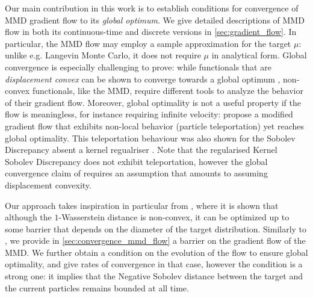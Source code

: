  



Our main contribution in this work is to establish conditions for convergence of MMD gradient flow to its {\em global optimum}.
We give detailed descriptions of  MMD flow in both its continuous-time and discrete versions in \cref{sec:gradient_flow}.
In particular, the MMD flow may employ a sample approximation for the target $\mu$: unlike e.g. Langevin Monte Carlo,
it does not require  $\mu$ in analytical form.
Global convergence is especially challenging to prove: while functionals  that are \textit{displacement convex} can be shown to converge towards a global optimum \cite{Villani:2004}, non-convex functionals, like the MMD,  require different tools to analyze the behavior of their gradient flow.
Moreover, global optimality is not a useful property if the flow is meaningless, for instance requiring infinite velocity: \cite{rotskoff2019global} propose a modified gradient flow that exhibits non-local behavior (particle teleportation) yet reaches global optimality. 
This teleportation behaviour was also shown for the Sobolev Discrepancy absent a kernel regualriser \cite[Theorem 4, Appendix D]{Mroueh:2019}.
Note that the regularised Kernel Sobolev Discrepancy does not exhibit teleportation, however the global convergence claim of \cite[Proposition 3, Appendix B.1]{Mroueh:2019} requires an assumption \cite[Assumption A]{Mroueh:2019} that amounts to assuming displacement convexity.

Our approach takes  inspiration in particular from \cite{Bottou:2017}, where it is shown that although the $1$-Wasserstein distance is non-convex, it can be optimized up to some barrier that depends on the diameter of the target distribution.
Similarly to \cite{Bottou:2017}, we provide in \cref{sec:convergence_mmd_flow} a barrier on the gradient flow of the MMD.
We further obtain a condition on the evolution of the flow to ensure global optimality, and give rates of convergence in that case, however
the condition is a strong one: it implies that the Negative Sobolev distance between the target and the current particles remains bounded at all time.

